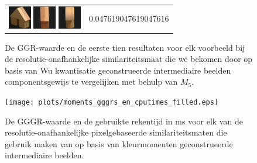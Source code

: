 \begin{figure}[!p]
\begin{center}
\begin{tabular}{m{11cm} | m{3cm} |}
\includegraphics[width=1cm]{coil/beeld-46.eps}
\includegraphics[width=1cm]{coil/beeld-44.eps}
\includegraphics[width=1cm]{coil/beeld-2.eps}
& {\scriptsize 0.047619047619047616}
\\
\end{tabular}
\caption{\label{fig:results_beste_dom_colors}De GGR-waarde en de eerste tien resultaten voor elk 
voorbeeld bij de resolutie-onafhankelijke similariteitsmaat die we bekomen door op basis van Wu 
kwantisatie geconstrueerde intermediaire beelden componentsgewijs te vergelijken met behulp van 
$M_5$.}
\end{center}
\end{figure}

\begin{figure}[!t]
\begin{center}
\texttt{[image: plots/moments\_gggrs\_en\_cputimes\_filled.eps]}
\caption{\label{fig:moments_gggrs_en_cputimes}De GGGR-waarde en de gebruikte rekentijd in ms voor elk van de resolutie-onafhankelijke pixelgebaseerde similariteitsmaten die gebruik maken 
van op basis van kleurmomenten geconstrueerde intermediaire beelden.}
\end{center}
\end{figure}

